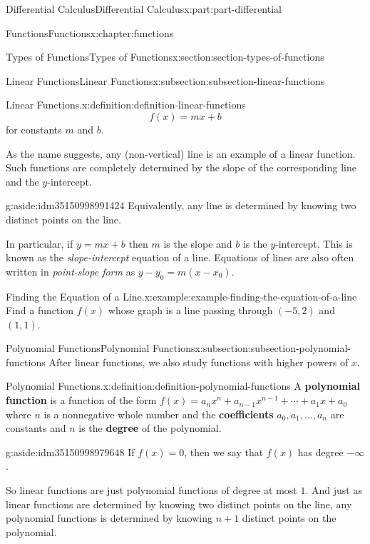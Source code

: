 \documentclass[twoside,10pt,]{tufte-book}
\newcommand{\terminology}[1]{\textbf{#1}}
\numberwithin{equation}{part}
\begin{document}
\begin{partptx}{Differential Calculus}{}{Differential Calculus}{}{}{x:part:part-differential}
\begin{chapterptx}{Functions}{}{Functions}{}{}{x:chapter:functions}
\begin{sectionptx}{Types of Functions}{}{Types of Functions}{}{}{x:section:section-types-of-functions}
\begin{subsectionptx}{Linear Functions}{}{Linear Functions}{}{}{x:subsection:subsection-linear-functions}
\begin{definition}{Linear Functions.}{x:definition:definition-linear-functions}
\begin{equation*}
f(x) = mx + b
\end{equation*}
for constants \(m\) and \(b\).%
\end{definition}
As the name suggests, any (non-vertical) line is an example of a linear function. Such functions are completely determined by the slope of the corresponding line and the \(y\)-intercept. \begin{aside}{}{g:aside:idm35150998991424}%
Equivalently, any line is determined by knowing two distinct points on the line.%
\end{aside}
 In particular, if \(y = mx + b\) then \(m\) is the slope and \(b\) is the \(y\)-intercept. This is known as the \emph{slope-intercept} equation of a line. Equations of lines are also often written in \emph{point-slope form} as \(y - y_{0} = m(x - x_{0})\).%
\begin{example}{Finding the Equation of a Line.}{x:example:example-finding-the-equation-of-a-line}%
Find a function \(f(x)\) whose graph is a line passing through \((-5,2)\) and \((1,1)\).%
\end{example}
\end{subsectionptx}
%
%
\typeout{************************************************}
\typeout{************************************************}
%
\begin{subsectionptx}{Polynomial Functions}{}{Polynomial Functions}{}{}{x:subsection:subsection-polynomial-functions}
After linear functions, we also study functions with higher powers of \(x\).%
\begin{definition}{Polynomial Functions.}{x:definition:definition-polynomial-functions}%
%
A \terminology{polynomial function} is a function of the form \(f(x) = a_{n}x^{n} + a_{n-1}x^{n-1} + \cdots + a_{1}x + a_{0}\) where \(n\) is a nonnegative whole number and the \terminology{coefficients} \(a_{0}, a_{1},\ldots, a_{n}\) are constants and \(n\) is the \terminology{degree} of the polynomial.%
\end{definition}
\begin{aside}{}{g:aside:idm35150998979648}%
If \(f(x) = 0\), then we say that \(f(x)\) has degree \(-\infty\).%
\end{aside}
So linear functions are just polynomial functions of degree at most \(1\). And just as linear functions are determined by knowing two distinct points on the line, any polynomial functions is determined by knowing \(n+1\) distinct points on the polynomial.%

\end{subsectionptx}
\end{sectionptx}
\end{chapterptx}
\end{partptx}
\end{document}
